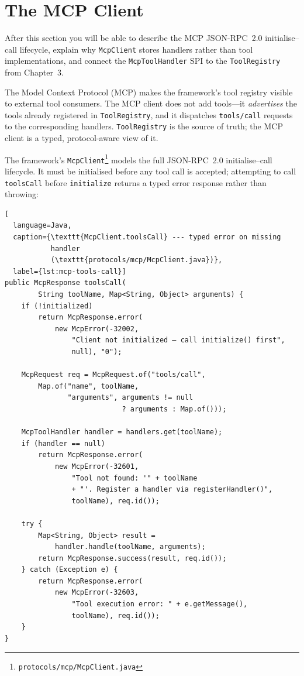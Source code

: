 \section{The MCP Client}
\label{sec:mcp-server}

\begin{learningbox}
After this section you will be able to describe the MCP
JSON-RPC~2.0 initialise--call lifecycle, explain why
\lstinline{McpClient} stores handlers rather than tool
implementations, and connect the \lstinline{McpToolHandler} SPI
to the \lstinline{ToolRegistry} from Chapter~3.
\end{learningbox}

The Model Context Protocol (MCP) makes the framework's tool registry
visible to external tool consumers.  The MCP client does not add
tools---it \emph{advertises} the tools already registered in
\lstinline{ToolRegistry}, and it dispatches \lstinline{tools/call}
requests to the corresponding handlers.  \lstinline{ToolRegistry} is
the source of truth; the MCP client is a typed, protocol-aware view
of it.

The framework's \lstinline{McpClient}\footnote{\texttt{protocols/mcp/McpClient.java}}
models the full JSON-RPC~2.0 initialise--call lifecycle.  It must be
initialised before any tool call is accepted; attempting to call
\lstinline{toolsCall} before \lstinline{initialize} returns a typed
error response rather than throwing:

\begin{lstlisting}[
  language=Java,
  caption={\texttt{McpClient.toolsCall} --- typed error on missing
           handler
           (\texttt{protocols/mcp/McpClient.java})},
  label={lst:mcp-tools-call}]
public McpResponse toolsCall(
        String toolName, Map<String, Object> arguments) {
    if (!initialized)
        return McpResponse.error(
            new McpError(-32002,
                "Client not initialized — call initialize() first",
                null), "0");

    McpRequest req = McpRequest.of("tools/call",
        Map.of("name", toolName,
               "arguments", arguments != null
                            ? arguments : Map.of()));

    McpToolHandler handler = handlers.get(toolName);
    if (handler == null)
        return McpResponse.error(
            new McpError(-32601,
                "Tool not found: '" + toolName
                + "'. Register a handler via registerHandler()",
                toolName), req.id());

    try {
        Map<String, Object> result =
            handler.handle(toolName, arguments);
        return McpResponse.success(result, req.id());
    } catch (Exception e) {
        return McpResponse.error(
            new McpError(-32603,
                "Tool execution error: " + e.getMessage(),
                toolName), req.id());
    }
}
\end{lstlisting}

